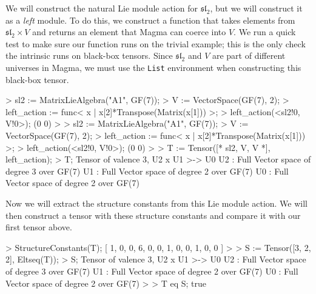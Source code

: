 \begin{example}[SCFromBBTensors]

We will construct the natural Lie module action for $\mathfrak{sl}_2$, but we will construct it as a \emph{left} module. 
To do this, we construct a function that takes elements from $\mathfrak{sl}_2\times V$ and returns an element that Magma can coerce into $V$. 
We run a quick test to make sure our function runs on the trivial example; this is the only check the intrinsic runs on black-box tensors. 
Since $\mathfrak{sl}_2$ and $V$ are part of different universes in Magma, we must use the {\tt List} environment when constructing this black-box tensor. 

\begin{code}
> sl2 := MatrixLieAlgebra("A1", GF(7));
> V := VectorSpace(GF(7), 2);
> left_action := func< x | x[2]*Transpose(Matrix(x[1])) >;
> left_action(<sl2!0, V!0>);
(0 0)
> 
> sl2 := MatrixLieAlgebra("A1", GF(7));
> V := VectorSpace(GF(7), 2);
> left_action := func< x | x[2]*Transpose(Matrix(x[1])) >;
> left_action(<sl2!0, V!0>);
(0 0)
> 
> T := Tensor([* sl2, V, V *], left_action);
> T;
Tensor of valence 3, U2 x U1 >-> U0
U2 : Full Vector space of degree 3 over GF(7)
U1 : Full Vector space of degree 2 over GF(7)
U0 : Full Vector space of degree 2 over GF(7)
\end{code}

Now we will extract the structure constants from this Lie module action. 
We will then construct a tensor with these structure constants and compare it with our first tensor above.

\begin{code}
> StructureConstants(T);
[ 1, 0, 0, 6, 0, 0, 1, 0, 0, 1, 0, 0 ]
> 
> S := Tensor([3, 2, 2], Eltseq(T));
> S;
Tensor of valence 3, U2 x U1 >-> U0
U2 : Full Vector space of degree 3 over GF(7)
U1 : Full Vector space of degree 2 over GF(7)
U0 : Full Vector space of degree 2 over GF(7)
> 
> T eq S;
true
\end{code}
\end{example}


